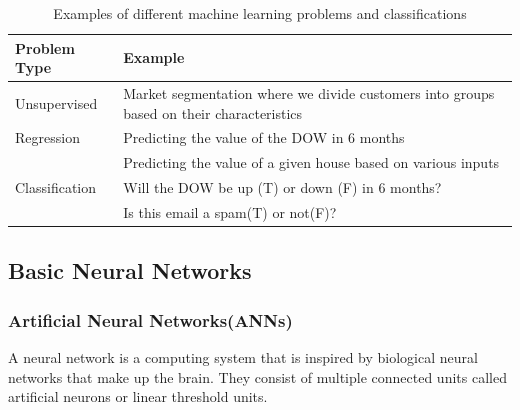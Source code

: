 \documentclass[article]{llncs}
\begin{document}
\begin{table}
\caption{Examples of different machine learning problems and classifications}\label{tab1}
\begin{tabular}{|l|l|}
\hline
Problem Type &  Example \\
\hline
Unsupervised &  {Market segmentation where we divide customers into groups based on their characteristics}\\
\hline
Regression &  {Predicting the value of the DOW in 6 months} \\
           & {Predicting the value of a given house based on various inputs}\\
\hline
Classification & {Will the DOW be up (T) or down (F) in 6 months?}\\
               & {Is this email a spam(T) or not(F)?} \\
\hline
\end{tabular}
\end{table}

\subsection{Basic Neural Networks}

\subsubsection{Artificial Neural Networks(ANNs)} A neural network is a computing system that is inspired by biological neural networks that make up the brain. They consist of multiple connected units called artificial neurons or linear threshold units.
\end{document}
